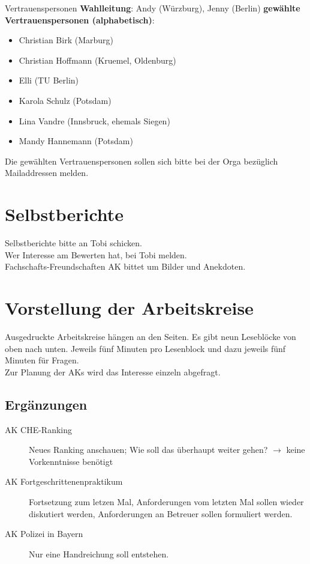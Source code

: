   \begin{info}{Vertrauenspersonen}
    \textbf{Wahlleitung}: Andy (Würzburg), Jenny (Berlin)
    \tcblower
    \textbf{gewählte Vertrauenspersonen (alphabetisch)}:
    \begin{itemize}
      \item Christian Birk (Marburg)
      \item Christian Hoffmann (Kruemel, Oldenburg)
      \item Elli (TU Berlin)
      \item Karola Schulz (Potsdam)
      \item Lina Vandre (Innsbruck, ehemals Siegen)
      \item Mandy Hannemann (Potsdam)
    \end{itemize}
  \end{info}
  Die gewählten Vertrauenspersonen sollen sich bitte bei der Orga bezüglich Mailaddressen melden.

\section{Selbstberichte}
  Selbstberichte bitte an Tobi schicken. \\
  Wer Interesse am Bewerten hat, bei Tobi melden. \\
  Fachschafts-Freundschaften AK bittet um Bilder und Anekdoten.

\section{Vorstellung der Arbeitskreise}
  Ausgedruckte Arbeitskreise hängen an den Seiten. Es gibt neun Leseblöcke von oben nach unten. Jeweils fünf Minuten pro Lesenblock und dazu jeweils fünf Minuten für Fragen. \\
  Zur Planung der AKs wird das Interesse einzeln abgefragt.

  \subsection{Ergänzungen}
    \begin{description}
      \item[AK CHE-Ranking] Neues Ranking anschauen; Wie soll das überhaupt weiter gehen? $\rightarrow$ keine Vorkenntnisse benötigt
      \item[AK Fortgeschrittenenpraktikum] Fortsetzung zum letzen Mal, Anforderungen vom letzten Mal sollen wieder diskutiert werden, Anforderungen an Betreuer sollen formuliert werden.
      \item[AK Polizei in Bayern] Nur eine Handreichung soll entstehen.
    \end{description}

